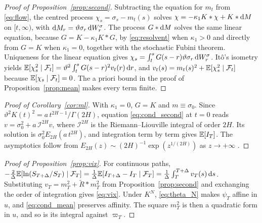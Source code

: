 \begin{proof}[Proof of Proposition~\ref{prop:second}] Subtracting the equation for $m_t$ from \eqref{eq:flow}, the centred process $\chi_s=\sigma_s-m_t(s)$ solves $\chi=-\kappa_1K*\chi+K*\mathrm{d} M$ on $[t,\infty)$, with $\mathrm{d} M_r=\vartheta\sigma_r\,\mathrm{d} W^\sigma_r$. The process $G*\mathrm{d} M$ solves the same linear equation, because $G=K-\kappa_1K*G$, by \eqref{eq:resolvent} when $\kappa_1>0$ and directly from $G=K$ when $\kappa_1=0$, together with the stochastic Fubini theorem. Uniqueness for the linear equation gives $\chi_s=\int_t^sG(s-r)\vartheta\sigma_r\,\mathrm{d} W^\sigma_r$. It\^o's isometry yields $\mathbb{E}[\chi_s^2\mid\mathcal{F}_t]=\vartheta^2\int_t^sG(s-r)^2v_t(r)\,\mathrm{d} r$, and $v_t(s)=m_t(s)^2+\mathbb{E}[\chi_s^2\mid\mathcal{F}_t]$ because $\mathbb{E}[\chi_s\mid\mathcal{F}_t]=0$. The a priori bound in the proof of Proposition~\ref{prop:mean} makes every term finite.
\end{proof}

\begin{proof}[Proof of Corollary~\ref{cor:ml}] With $\kappa_1=0$, $G=K$ and $m\equiv\sigma_0$. Since $\vartheta^2K(t)^2=a\,t^{2H-1}/\Gamma(2H)$, equation \eqref{eq:cond_second} at $t=0$ reads $v=\sigma_0^2+a\,\mathcal{I}^{2H}v$, where $\mathcal{I}^{2H}$ is the Riemann--Liouville integral of order $2H$. Its solution is $\sigma_0^2E_{2H}(a\,t^{2H})$, and integration term by term gives $\mathbb{E}[I_T]$. The asymptotics follow from $E_{2H}(z)\sim(2H)^{-1}\exp(z^{1/(2H)})$ as $z\to+\infty$ \citep{GorenfloKilbasMainardiRogosin2014}.
\end{proof}

\begin{proof}[Proof of Proposition~\ref{prop:vix}] For continuous paths, $-\tfrac2\Delta\mathbb{E}[\ln(S_{T+\Delta}/S_T)\mid\mathcal{F}_T]=\tfrac1\Delta\mathbb{E}[I_{T+\Delta}-I_T\mid\mathcal{F}_T]=\tfrac1\Delta\int_T^{T+\Delta}v_T(s)\,\mathrm{d} s$. Substituting $v_T=m_T^2+\widetilde R*m_T^2$ from Proposition~\ref{prop:second} and exchanging the order of integration gives \eqref{eq:vix}. Under $K^N$, \eqref{eq:theta_N} makes $\psi_T$ affine in $u$, and \eqref{eq:cond_mean} preserves affinity. The square $m_T^2$ is then a quadratic form in $u$, and so is its integral against $\varpi_T$.
\end{proof}

